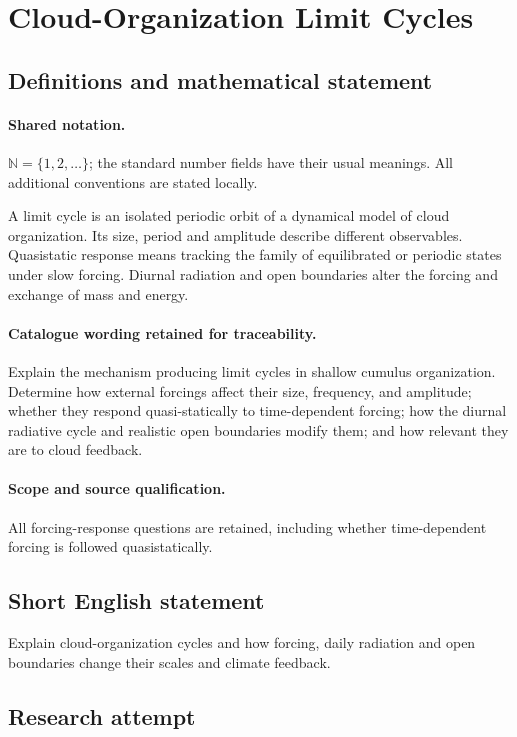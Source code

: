 \documentclass[11pt]{article}
\begin{document}
\section{Cloud-Organization Limit Cycles}\label{statement}

\subsection{Definitions and mathematical statement}

\paragraph{Shared notation.}$\mathbb N=\{1,2,\ldots\}$; the standard number fields have their usual meanings. All additional conventions are stated locally.


A limit cycle is an isolated periodic orbit of a dynamical model of cloud organization. Its size, period and amplitude describe different observables. Quasistatic response means tracking the family of equilibrated or periodic states under slow forcing. Diurnal radiation and open boundaries alter the forcing and exchange of mass and energy.

\paragraph{Catalogue wording retained for traceability.}
Explain the mechanism producing limit cycles in shallow cumulus organization. Determine how external forcings affect their size, frequency, and amplitude; whether they respond quasi-statically to time-dependent forcing; how the diurnal radiative cycle and realistic open boundaries modify them; and how relevant they are to cloud feedback.

\paragraph{Scope and source qualification.}All forcing-response questions are retained, including whether time-dependent forcing is followed quasistatically.
\subsection{Short English statement}
Explain cloud-organization cycles and how forcing, daily radiation and open boundaries change their scales and climate feedback.
\subsection{Research attempt}
\end{document}
